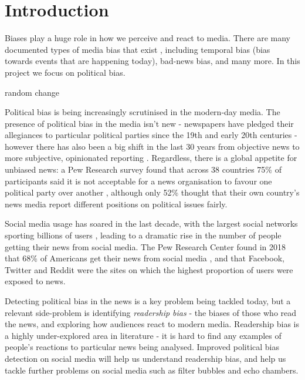 \chapter{Introduction}

Biases play a huge role in how we perceive and react to media. There are many documented types of media bias that exist \cite{types-of-bias}, including temporal bias (bias towards events that are happening today), bad-news bias, and many more. In this project we focus on political bias.


random change

Political bias is being increasingly scrutinised in the modern-day media. The presence of political bias in the media isn't new - newspapers have pledged their allegiances to particular political parties since the 19th and early 20th centuries \cite{partisanship-history} - however there has also been a big shift in the last 30 years from objective news to more subjective, opinionated reporting \cite{subjective-news}. Regardless, there is a global appetite for unbiased news: a Pew Research survey found that across 38 countries 75\% of participants said it is not acceptable for a news organisation to favour one political party over another \cite{pew-unbiased}, although only 52\% thought that their own country's news media report different positions on political issues fairly.

Social media usage has soared in the last decade, with the largest social networks sporting billions of users \cite{rise-of-social-media}, leading to a dramatic rise in the number of people getting their news from social media. The Pew Research Center found in 2018 that 68\% of Americans get their news from social media \cite{pew-social-media-news-2018}, and that Facebook, Twitter and Reddit were the sites on which the highest proportion of users were exposed to news.

Detecting political bias in the news is a key problem being tackled today, but a relevant side-problem is identifying \textit{readership bias} - the biases of those who read the news, and exploring how audiences react to modern media. Readership bias is a highly under-explored area in literature - it is hard to find any examples of people's reactions to particular news being analysed. Improved political bias detection on social media will help us understand readership bias, and help us tackle further problems on social media such as filter bubbles and echo chambers.

